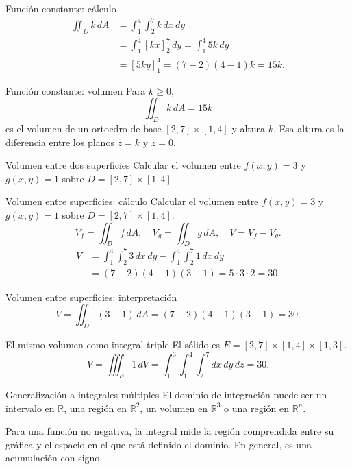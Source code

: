 \documentclass[original_version/main.tex]{subfiles}
\begin{document}
\begin{frame}{Función constante: cálculo}
\begin{align*}\iint_Dk\,dA&=\int_1^4\int_2^7k\,dx\,dy\\&=\int_1^4[kx]_2^7\,dy=\int_1^4 5k\,dy\\&=[5ky]_1^4=(7-2)(4-1)k=15k.\end{align*}
\end{frame}

\begin{frame}{Función constante: volumen}
Para $k\ge0$,\[\iint_D k\,dA=15k\]es el volumen de un ortoedro de base $[2,7]\times[1,4]$ y altura $k$. Esa altura es la diferencia entre los planos $z=k$ y $z=0$.
\end{frame}

\begin{frame}{Volumen entre dos superficies}
Calcular el volumen entre $f(x,y)=3$ y $g(x,y)=1$ sobre $D=[2,7]\times[1,4]$.
\end{frame}

\begin{frame}{Volumen entre superficies: cálculo}
\small Calcular el volumen entre $f(x,y)=3$ y $g(x,y)=1$ sobre $D=[2,7]\times[1,4]$.\[V_f=\iint_D f\,dA,\quad V_g=\iint_Dg\,dA,\quad V=V_f-V_g.\]\begin{align*}V&=\int_1^4\int_2^7 3\,dx\,dy-\int_1^4\int_2^7 1\,dx\,dy\\&=(7-2)(4-1)(3-1)=5\cdot3\cdot2=30.\end{align*}
\end{frame}

\begin{frame}{Volumen entre superficies: interpretación}
\[V=\iint_D(3-1)\,dA=(7-2)(4-1)(3-1)=30.\]
\end{frame}

\begin{frame}{El mismo volumen como integral triple}
El sólido es $E=[2,7]\times[1,4]\times[1,3]$.\[V=\iiint_E1\,dV=\int_1^3\int_1^4\int_2^7dx\,dy\,dz=30.\]
\end{frame}

\begin{frame}{Generalización a integrales múltiples}
El dominio de integración puede ser un intervalo en $\mathbb R$, una región en $\mathbb R^2$, un volumen en $\mathbb R^3$ o una región en $\mathbb R^n$.\par\medskip Para una función no negativa, la integral mide la región comprendida entre su gráfica y el espacio en el que está definido el dominio. En general, es una acumulación con signo.
\end{frame}
\end{document}
